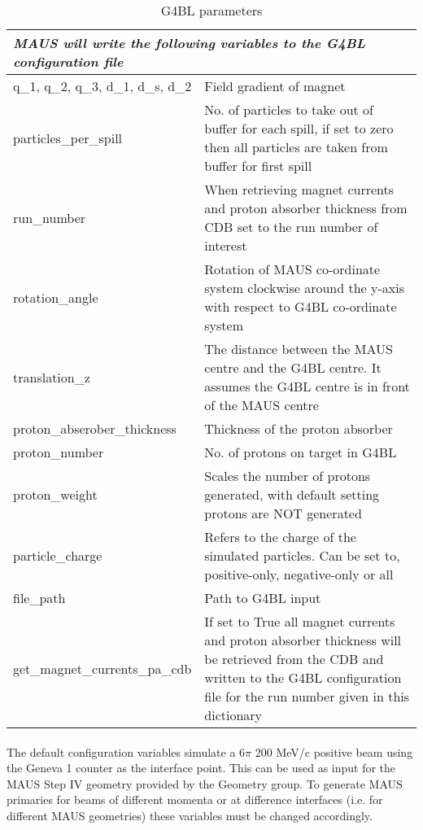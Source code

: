 \begin{table}
\caption{G4BL parameters}
\begin{tabular}{|l | p{10cm}|}
\hline
\multicolumn{2}{|l|}{\textit{MAUS will write the following variables to the G4BL configuration file}} \\
\hline
q\_1, q\_2, q\_3, d\_1, d\_s, d\_2 & Field gradient of magnet \\
\hline
particles\_per\_spill & No. of particles to take out of buffer for each spill, if set to zero then all particles are taken from buffer for first spill \\
\hline
run\_number & When retrieving magnet currents and proton absorber thickness from CDB set to the run number of interest \\
\hline
rotation\_angle & Rotation of MAUS co-ordinate system clockwise around the y-axis with respect to G4BL co-ordinate system \\
\hline
translation\_z & The distance between the MAUS centre and the G4BL centre. It assumes the G4BL centre is in front of the MAUS centre \\
\hline
proton\_abserober\_thickness & Thickness of the proton absorber \\
\hline
proton\_number & No. of protons on target in G4BL \\
\hline
proton\_weight & Scales the number of protons generated, with default setting protons are NOT generated \\
\hline
particle\_charge & Refers to the charge of the simulated particles. Can be set to, positive-only, negative-only or all \\
\hline
file\_path & Path to G4BL input \\
\hline
get\_magnet\_currents\_pa\_cdb & If set to True all magnet currents and proton absorber thickness will be retrieved from the CDB and written to the G4BL configuration file for the run number given in this dictionary \\
\hline
\end{tabular}
\label{table}
\end{table}

\paragraph{}

The default configuration variables simulate a 6$\pi$ 200 MeV/c positive beam using the Geneva 1 counter as the interface point. This can be used as input for the MAUS Step IV geometry provided by the Geometry group. To generate MAUS primaries for beams of different momenta or at difference interfaces (i.e. for different MAUS geometries) these variables must be changed accordingly. 

